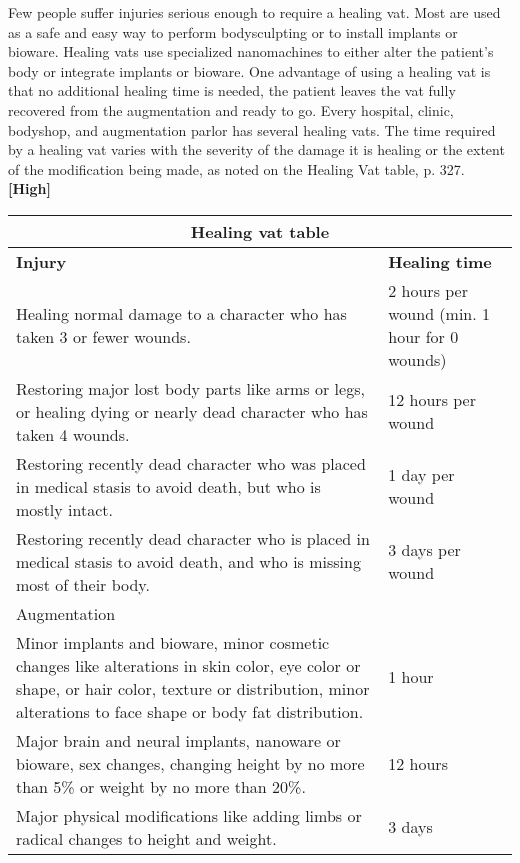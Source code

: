 Few people suffer injuries serious enough to require a healing vat. Most are used as a safe and easy way to perform bodysculpting or to install implants or bioware. Healing vats use specialized nanomachines to either alter the patient’s body or integrate implants or bioware. One advantage of using a healing vat is that no additional healing time is needed, the patient leaves the vat fully recovered from the augmentation and ready to go. Every hospital, clinic, bodyshop, and augmentation parlor has several healing vats. The time required by a healing vat varies with the severity of the damage it is healing or the extent of the modification being made, as noted on the Healing Vat table, p. 327. \textbf{[High]} 

\begin{table} \begin{tabularx}{\textwidth}{|X|X|} \hline

\multicolumn{2}{|c|}{Healing vat table} \\ \hline

\textbf{Injury}	&\textbf{Healing time} \\ \hline

Healing normal damage to a character who has taken 3 or fewer wounds.	&2 hours per wound (min. 1 hour for 0 wounds) \\ \hline

Restoring major lost body parts like arms or legs, or healing dying or nearly dead character who has taken 4 wounds.	&12 hours per wound \\ \hline

Restoring recently dead character who was placed in medical stasis to avoid death, but who is mostly intact.	&1 day per wound \\ \hline

Restoring recently dead character who is placed in medical stasis to avoid death, and who is missing most of their body.	&3 days per wound \\ \hline

\multicolumn{2}{|l|}{Augmentation} \\ \hline

Minor implants and bioware, minor cosmetic changes like alterations in skin color, eye color or shape, or hair color, texture or distribution, minor alterations to face shape or body fat distribution.	&1 hour \\ \hline

Major brain and neural implants, nanoware or bioware, sex changes, changing height by no more than 5\% or weight by no more than 20\%.	&12 hours \\ \hline

Major physical modifications like adding limbs or radical changes to height and weight.	&3 days \\ \hline

\end{tabularx} \label{tab:healing-vat} \end{table} 

